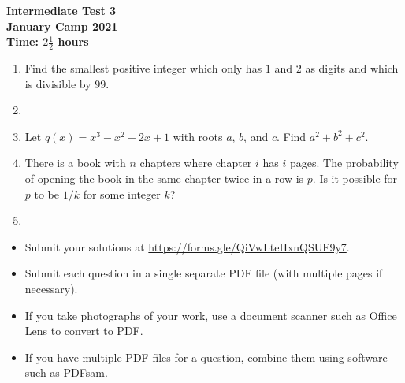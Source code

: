 \documentclass{article}
\begin{document}
\thispagestyle{empty}

\begin{center}
  \textbf{\Large Intermediate Test 3}
  \\ \vspace{1em}
  \textbf{\large January Camp 2021}
  \\ \vspace{1em}
  \textbf{\large Time: $2\frac{1}{2}$ hours}
\end{center}

\vspace{24pt}

\begin{enumerate}[1.]

\item %
Find the smallest positive integer which only has $1$ and $2$ as digits and which is divisible by $99$.


\item %


\item %
Let $q(x) = x^3 -x^2 -2x +1$ with roots $a$, $b$, and $c$.
Find $a^2 +b^2 + c^2$.


\item %
There is a book with $n$ chapters where chapter $i$ has $i$ pages.
The probability of opening the book in the same chapter twice in a row is $p$.
Is it possible for $p$ to be $1/k$ for some integer $k$?


\item %


\end{enumerate}


\vfill
\begin{itemize}
	\item Submit your solutions at \url{https://forms.gle/QiVwLteHxnQSUF9y7}.
	\item Submit each question in a single separate PDF file (with multiple pages if necessary).
	\item If you take photographs of your work, use a document scanner such as Office Lens to convert to PDF.
	\item If you have multiple PDF files for a question, combine them using software such as PDFsam.
\end{itemize}

\vfill
\centering
\begin{BVerbatim}
\end{BVerbatim}
\end{document}

